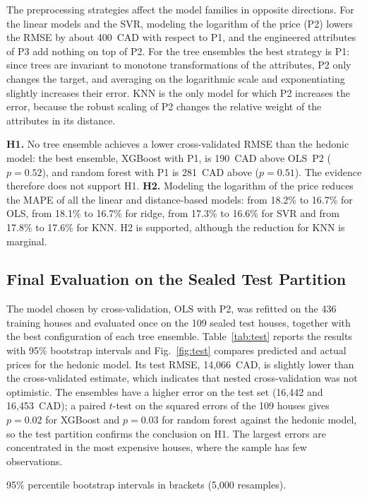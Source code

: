 \documentclass[conference]{IEEEtran}
\begin{document}
The preprocessing strategies affect the model families in opposite directions. For the linear models and the SVR, modeling the logarithm of the price (P2) lowers the RMSE by about 400~CAD with respect to P1, and the engineered attributes of P3 add nothing on top of P2. For the tree ensembles the best strategy is P1: since trees are invariant to monotone transformations of the attributes, P2 only changes the target, and averaging on the logarithmic scale and exponentiating slightly increases their error. KNN is the only model for which P2 increases the error, because the robust scaling of P2 changes the relative weight of the attributes in its distance.

\textbf{H1.} No tree ensemble achieves a lower cross-validated RMSE than the hedonic model: the best ensemble, XGBoost with P1, is 190~CAD above OLS~P2 ($p = 0.52$), and random forest with P1 is 281~CAD above ($p = 0.51$). The evidence therefore does not support H1. \textbf{H2.} Modeling the logarithm of the price reduces the MAPE of all the linear and distance-based models: from 18.2\% to 16.7\% for OLS, from 18.1\% to 16.7\% for ridge, from 17.3\% to 16.6\% for SVR and from 17.8\% to 17.6\% for KNN. H2 is supported, although the reduction for KNN is marginal.

\subsection{Final Evaluation on the Sealed Test Partition}

The model chosen by cross-validation, OLS with P2, was refitted on the 436 training houses and evaluated once on the 109 sealed test houses, together with the best configuration of each tree ensemble. Table~\ref{tab:test} reports the results with 95\% bootstrap intervals and Fig.~\ref{fig:test} compares predicted and actual prices for the hedonic model. Its test RMSE, 14,066~CAD, is slightly lower than the cross-validated estimate, which indicates that nested cross-validation was not optimistic. The ensembles have a higher error on the test set (16,442 and 16,453~CAD); a paired $t$-test on the squared errors of the 109 houses gives $p = 0.02$ for XGBoost and $p = 0.03$ for random forest against the hedonic model, so the test partition confirms the conclusion on H1. The largest errors are concentrated in the most expensive houses, where the sample has few observations.

\begin{table}[t]
\caption{Results on the Sealed Test Partition (109 Houses, CAD, 1987)}
\label{tab:test}
\centering
\footnotesize
\setlength{\tabcolsep}{3pt}

\smallskip
\raggedright
95\% percentile bootstrap intervals in brackets (5,000 resamples).
\end{table}
\end{document}
